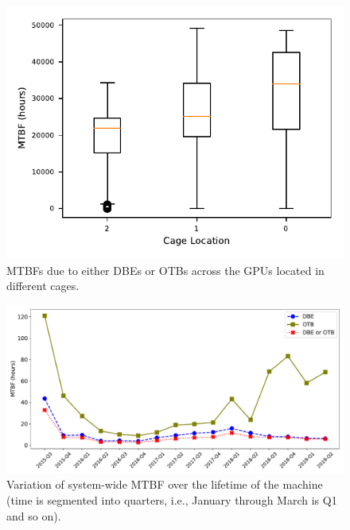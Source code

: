 \begin{figure}[bt]
  \begin{center}
    \includegraphics[width=\columnwidth]{figs/MTBF_CageWise.pdf}
  \end{center}
  \caption{MTBFs due to either DBEs or OTBs across the GPUs located in different cages.}
  \label{fig:CageWise_MTBFs}
\end{figure}


\begin{figure}[bt]
  \begin{center}
    \includegraphics[width=\columnwidth]{figs/MTBF_quaterly_sys.pdf}
  \end{center}
  \caption{Variation of system-wide MTBF over the lifetime of the machine (time is segmented into quarters, 
i.e., January through March is Q1 and so on).}
  \label{fig:MTBF_sys}
\end{figure}

